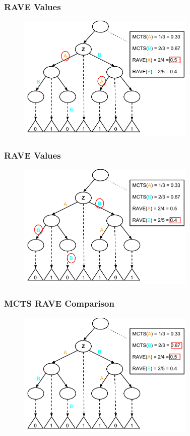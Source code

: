 \documentclass{beamer}
\begin{document}
\begin{frame}[fragile]
\frametitle{RAVE Values}
\begin{figure}[h]
	\includegraphics[width=8.5cm]{Diagrams/Rave/RAVEValueA.pdf}
	\centering
\end{figure}
\end{frame}

\begin{frame}[fragile]
\frametitle{RAVE Values}
\begin{figure}[h]
	\includegraphics[width=8.5cm]{Diagrams/Rave/RAVEValueB.pdf}
	\centering
\end{figure}
\end{frame}

\begin{frame}[fragile]
\frametitle{MCTS RAVE Comparison}
\begin{figure}[h]
	\includegraphics[width=8.5cm]{Diagrams/Rave/RAVEDiagramComparison.pdf}
	\centering
\end{figure}
\end{frame}
\end{document}
